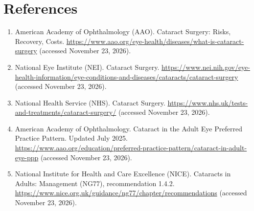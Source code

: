 \section*{References}
\begin{enumerate}
  \item American Academy of Ophthalmology (AAO). Cataract Surgery: Risks, Recovery, Costs. \url{https://www.aao.org/eye-health/diseases/what-is-cataract-surgery} (accessed November 23, 2026).
  \item National Eye Institute (NEI). Cataract Surgery. \url{https://www.nei.nih.gov/eye-health-information/eye-conditions-and-diseases/cataracts/cataract-surgery} (accessed November 23, 2026).
  \item National Health Service (NHS). Cataract Surgery. \url{https://www.nhs.uk/tests-and-treatments/cataract-surgery/} (accessed November 23, 2026).
  \item American Academy of Ophthalmology. Cataract in the Adult Eye Preferred Practice Pattern. Updated July 2025. \url{https://www.aao.org/education/preferred-practice-pattern/cataract-in-adult-eye-ppp} (accessed November 23, 2026).
  \item National Institute for Health and Care Excellence (NICE). Cataracts in Adults: Management (NG77), recommendation 1.4.2. \url{https://www.nice.org.uk/guidance/ng77/chapter/recommendations} (accessed November 23, 2026).
\end{enumerate}

\clearpage
